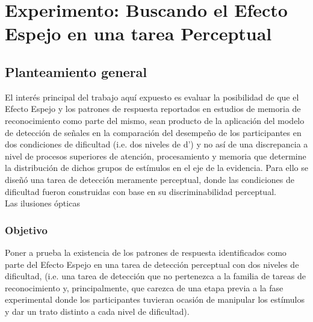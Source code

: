 
\chapter{Experimento: Buscando el Efecto Espejo en una tarea Perceptual} %

\label{Cap_Exp} %

\section{Planteamiento general}



El interés principal del trabajo aquí expuesto es evaluar la posibilidad de que el Efecto Espejo y los patrones de respuesta reportados en estudios de memoria de reconocimiento como parte del mismo, sean producto de la aplicación del modelo de detección de señales en la comparación del desempeño de los participantes en dos condiciones de dificultad (i.e. dos niveles de d') y no así de una discrepancia a nivel de procesos superiores de atención, procesamiento y memoria que determine la distribución de dichos grupos de estímulos en el eje de la evidencia. Para ello se diseñó una tarea de detección meramente perceptual, donde las condiciones de dificultad fueron construidas con base en su discriminabilidad perceptual.\\ 

Las ilusiones ópticas 

\subsection{Objetivo}

Poner a prueba la existencia de los patrones de respuesta identificados como parte del Efecto Espejo en una tarea de detección perceptual con dos niveles de dificultad, (i.e. una tarea de detección que no pertenezca a la familia de tareas de reconocimiento y, principalmente, que carezca de una etapa previa a la fase experimental donde los participantes tuvieran ocasión de manipular los estímulos y dar un trato distinto a cada nivel de dificultad).\\

